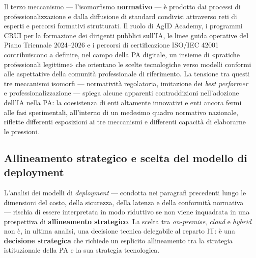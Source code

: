 Il terzo meccanismo — l'isomorfismo \textbf{normativo} — è prodotto dai processi di professionalizzazione e dalla diffusione di standard condivisi attraverso reti di esperti e percorsi formativi strutturati. Il ruolo di AgID Academy, i programmi CRUI per la formazione dei dirigenti pubblici sull'IA, le linee guida operative del Piano Triennale 2024--2026 e i percorsi di certificazione ISO/IEC 42001 contribuiscono a definire, nel campo della PA digitale, un insieme di «pratiche professionali legittime» che orientano le scelte tecnologiche verso modelli conformi alle aspettative della comunità professionale di riferimento. La tensione tra questi tre meccanismi isomorfi — normatività regolatoria, imitazione dei \textit{best performer} e professionalizzazione — spiega alcune apparenti contraddizioni nell'adozione dell'IA nella PA: la coesistenza di enti altamente innovativi e enti ancora fermi alle fasi sperimentali, all'interno di un medesimo quadro normativo nazionale, riflette differenti esposizioni ai tre meccanismi e differenti capacità di elaborarne le pressioni.



\subsection{Allineamento strategico e scelta del modello di deployment}
\label{subsec:allineamento-strategico}

L'analisi dei modelli di \textit{deployment} — condotta nei paragrafi precedenti lungo le dimensioni del costo, della sicurezza, della latenza e della conformità normativa — rischia di essere interpretata in modo riduttivo se non viene inquadrata in una prospettiva di \textbf{allineamento strategico}. La scelta tra \textit{on-premise}, \textit{cloud} e \textit{hybrid} non è, in ultima analisi, una decisione tecnica delegabile al reparto IT: è una \textbf{decisione strategica} che richiede un esplicito allineamento tra la strategia istituzionale della PA e la sua strategia tecnologica.

